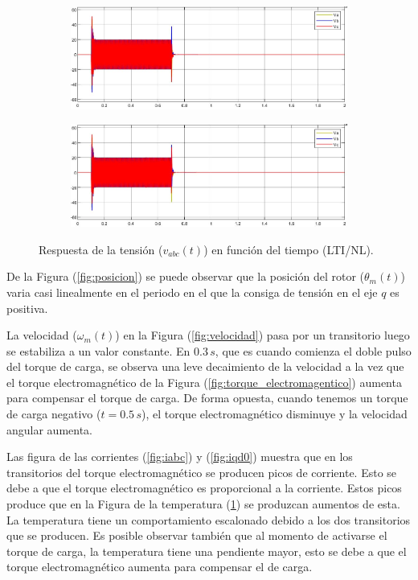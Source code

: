 \documentclass{article}
\begin{document}
\begin{figure}[H]
    \centering
    \begin{subfigure}[b]{0.8\textwidth}
        \includegraphics[width=\textwidth]{5.1.6_vabc.jpg}
    \end{subfigure}
    \begin{subfigure}[b]{0.8\textwidth}
        \includegraphics[width=1\textwidth]{5.1.6_vabc_NL.jpg}
    \end{subfigure}
    \caption{Respuesta de la tensión ($v_{abc}(t)$) en función del tiempo (LTI/NL).}
    \label{fig:temperatura}
\end{figure}

De la Figura (\ref{fig:posicion}) se puede observar que la posición del rotor ($\theta_m(t)$)
varia casi linealmente en el periodo en el que la consiga de tensión en el eje $q$ es positiva.

La velocidad ($\omega_m(t)$) en la Figura (\ref{fig:velocidad}) pasa por un transitorio luego 
se estabiliza a un valor constante. En $0.3 \, s$, que es cuando comienza el doble pulso del 
torque de carga, se observa una leve decaimiento de la velocidad a la vez que el torque electromagnético
de la Figura (\ref{fig:torque_electromagentico}) aumenta para compensar el torque de carga.
De forma opuesta, cuando tenemos un torque de carga negativo ($t = 0.5 \, s$), el torque electromagnético 
disminuye y la velocidad angular aumenta.

Las figura de las corrientes (\ref{fig:iabc}) y (\ref{fig:iqd0}) muestra que en los transitorios del torque electromagnético
se producen picos de corriente. Esto se debe a que el torque electromagnético es proporcional a la corriente.
Estos picos produce que en la Figura de la temperatura (\ref{fig:temperatura}) se produzcan aumentos de esta.
La temperatura tiene un comportamiento escalonado debido a los dos transitorios que se producen.
Es posible observar también que al momento de activarse el torque de carga, la temperatura tiene una 
pendiente mayor, esto se debe a que el torque electromagnético aumenta para compensar el de carga.
\end{document}
